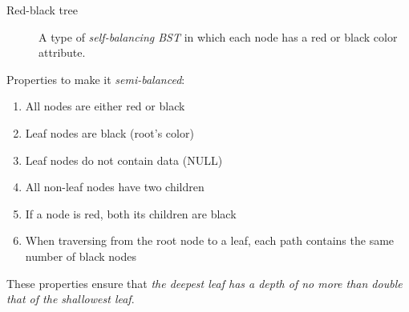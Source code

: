 \begin{refsection}
  \nocite{wikipedia-tree, wikipedia-bin-tree, wikipedia-bin-search-tree,
    wikipedia-avl-tree, wikipedia-red-black-tree, wikipedia-big-o}
  \printbibliography[prenote=wikipedia,heading=none]
\end{refsection}

\begin{frame}
  \begin{center}
  \end{center}
  \begin{description}
  \item[Red-black tree] A type of \emph{self-balancing BST} in which each node has a red
    or black color attribute.
  \end{description}  
  \begin{block}{Properties to make it \emph{semi-balanced}:}
    \begin{enumerate}
    \item All nodes are either red or black
    \item Leaf nodes are black (root's color)
    \item Leaf nodes do not contain data (NULL)
    \item All non-leaf nodes have two children
    \item If a node is red, both its children are black
    \item When traversing from the root node to a leaf, each path contains the same number
      of black nodes
    \end{enumerate}
    These properties ensure that \emph{the deepest leaf has a depth of no more than double that
    of the shallowest leaf}.
  \end{block}
\end{frame}

